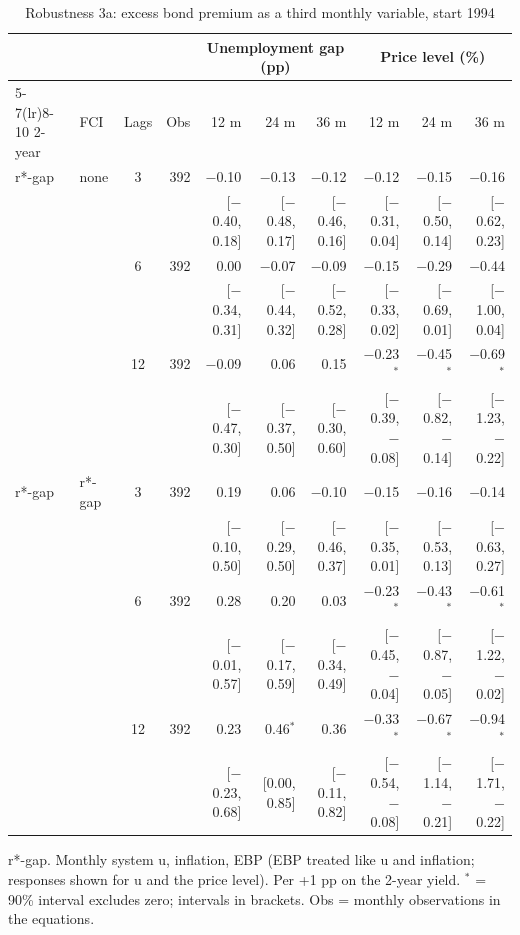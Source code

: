 \begin{table}[p]\centering\footnotesize\setlength{\tabcolsep}{2.2pt}
\caption{Robustness 3a: excess bond premium as a third monthly variable, start 1994}\label{tab:R3a}
\begin{tabular}{llcrrrrrrr}\toprule
 & & & & \multicolumn{3}{c}{Unemployment gap (pp)} & \multicolumn{3}{c}{Price level (\%)}\\ \cmidrule(lr){5-7}\cmidrule(lr){8-10}
2-year & FCI & Lags & Obs & 12 m & 24 m & 36 m & 12 m & 24 m & 36 m\\ \midrule
r*-gap & none & 3 & 392 & $-$0.10 & $-$0.13 & $-$0.12 & $-$0.12 & $-$0.15 & $-$0.16\\
 & & & & {\scriptsize [$-$0.40, 0.18]} & {\scriptsize [$-$0.48, 0.17]} & {\scriptsize [$-$0.46, 0.16]} & {\scriptsize [$-$0.31, 0.04]} & {\scriptsize [$-$0.50, 0.14]} & {\scriptsize [$-$0.62, 0.23]}\\
 &  & 6 & 392 & 0.00 & $-$0.07 & $-$0.09 & $-$0.15 & $-$0.29 & $-$0.44\\
 & & & & {\scriptsize [$-$0.34, 0.31]} & {\scriptsize [$-$0.44, 0.32]} & {\scriptsize [$-$0.52, 0.28]} & {\scriptsize [$-$0.33, 0.02]} & {\scriptsize [$-$0.69, 0.01]} & {\scriptsize [$-$1.00, 0.04]}\\
 &  & 12 & 392 & $-$0.09 & 0.06 & 0.15 & $-$0.23$^{*}$ & $-$0.45$^{*}$ & $-$0.69$^{*}$\\
 & & & & {\scriptsize [$-$0.47, 0.30]} & {\scriptsize [$-$0.37, 0.50]} & {\scriptsize [$-$0.30, 0.60]} & {\scriptsize [$-$0.39, $-$0.08]} & {\scriptsize [$-$0.82, $-$0.14]} & {\scriptsize [$-$1.23, $-$0.22]}\\
r*-gap & r*-gap & 3 & 392 & 0.19 & 0.06 & $-$0.10 & $-$0.15 & $-$0.16 & $-$0.14\\
 & & & & {\scriptsize [$-$0.10, 0.50]} & {\scriptsize [$-$0.29, 0.50]} & {\scriptsize [$-$0.46, 0.37]} & {\scriptsize [$-$0.35, 0.01]} & {\scriptsize [$-$0.53, 0.13]} & {\scriptsize [$-$0.63, 0.27]}\\
 &  & 6 & 392 & 0.28 & 0.20 & 0.03 & $-$0.23$^{*}$ & $-$0.43$^{*}$ & $-$0.61$^{*}$\\
 & & & & {\scriptsize [$-$0.01, 0.57]} & {\scriptsize [$-$0.17, 0.59]} & {\scriptsize [$-$0.34, 0.49]} & {\scriptsize [$-$0.45, $-$0.04]} & {\scriptsize [$-$0.87, $-$0.05]} & {\scriptsize [$-$1.22, $-$0.02]}\\
 &  & 12 & 392 & 0.23 & 0.46$^{*}$ & 0.36 & $-$0.33$^{*}$ & $-$0.67$^{*}$ & $-$0.94$^{*}$\\
 & & & & {\scriptsize [$-$0.23, 0.68]} & {\scriptsize [0.00, 0.85]} & {\scriptsize [$-$0.11, 0.82]} & {\scriptsize [$-$0.54, $-$0.08]} & {\scriptsize [$-$1.14, $-$0.21]} & {\scriptsize [$-$1.71, $-$0.22]}\\
\bottomrule\end{tabular}
\par\smallskip\parbox{0.96\linewidth}{\scriptsize r*-gap. Monthly system u, inflation, EBP (EBP treated like u and inflation; responses shown for u and the price level). Per +1 pp on the 2-year yield. $^{*}$ = 90\% interval excludes zero; intervals in brackets. Obs = monthly observations in the equations.}
\end{table}
